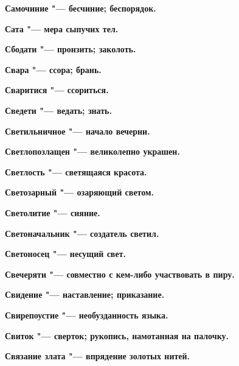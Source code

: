 \bfseries Самочиние \normalfont{} "--- бесчиние; беспорядок. 




\bfseries Сата \normalfont{} "--- мера сыпучих тел. 




\bfseries Сбодати \normalfont{} "--- пронзить; заколоть. 




\bfseries Свара \normalfont{} "--- ссора; брань. 




\bfseries Сваритися \normalfont{} "--- ссориться. 




\bfseries Сведети \normalfont{} "--- ведать; знать. 




\bfseries Светильничное \normalfont{} "--- начало вечерни. 




\bfseries Светлопозлащен \normalfont{} "--- великолепно украшен. 




\bfseries Светлость \normalfont{} "--- светящаяся красота. 




\bfseries Светозарный \normalfont{} "--- озаряющий светом. 




\bfseries Светолитие \normalfont{} "--- сияние. 




\bfseries Светоначальник \normalfont{} "--- создатель светил. 




\bfseries Светоносец \normalfont{} "--- несущий свет. 




\bfseries Свечеряти \normalfont{} "--- совместно с кем-либо участвовать в пиру. 




\bfseries Свидение \normalfont{} "--- наставление; приказание. 




\bfseries Свирепоустие \normalfont{} "--- необузданность языка. 




\bfseries Свиток \normalfont{} "--- сверток; рукопись, намотанная на палочку. 




\bfseries Связание злата \normalfont{} "--- впрядение золотых нитей. 




